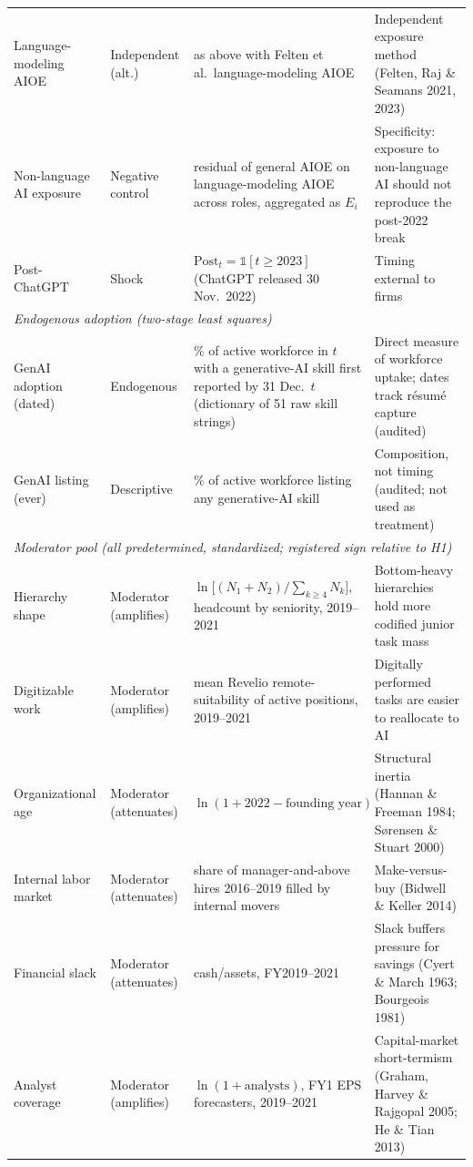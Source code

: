\begin{longtable}{p{2.3cm}p{1.35cm}p{6.3cm}p{5.2cm}}
Language-modeling AIOE & Independent (alt.) & as above with Felten et al.\ language-modeling AIOE & Independent exposure method (Felten, Raj \& Seamans 2021, 2023) \\
Non-language AI exposure & Negative control & residual of general AIOE on language-modeling AIOE across roles, aggregated as $E_i$ & Specificity: exposure to non-language AI should not reproduce the post-2022 break \\
Post-ChatGPT & Shock & $\text{Post}_t=\mathbb{1}[t\ge 2023]$ (ChatGPT released 30 Nov.\ 2022) & Timing external to firms \\
\midrule
\multicolumn{4}{l}{\textit{Endogenous adoption (two-stage least squares)}}\\
GenAI adoption (dated) & Endogenous & \% of active workforce in $t$ with a generative-AI skill first reported by 31 Dec.\ $t$ (dictionary of 51 raw skill strings) & Direct measure of workforce uptake; dates track r\'esum\'e capture (audited) \\
GenAI listing (ever) & Descriptive & \% of active workforce listing any generative-AI skill & Composition, not timing (audited; not used as treatment) \\
\midrule
\multicolumn{4}{l}{\textit{Moderator pool (all predetermined, standardized; registered sign relative to H1)}}\\
Hierarchy shape & Moderator (amplifies) & $\ln\big[(N_{1}+N_{2})/\sum_{k\ge4}N_{k}\big]$, headcount by seniority, 2019--2021 & Bottom-heavy hierarchies hold more codified junior task mass \\
Digitizable work & Moderator (amplifies) & mean Revelio remote-suitability of active positions, 2019--2021 & Digitally performed tasks are easier to reallocate to AI \\
Organizational age & Moderator (attenuates) & $\ln(1+2022-\text{founding year})$ & Structural inertia (Hannan \& Freeman 1984; S{\o}rensen \& Stuart 2000) \\
Internal labor market & Moderator (attenuates) & share of manager-and-above hires 2016--2019 filled by internal movers & Make-versus-buy (Bidwell \& Keller 2014) \\
Financial slack & Moderator (attenuates) & cash/assets, FY2019--2021 & Slack buffers pressure for savings (Cyert \& March 1963; Bourgeois 1981) \\
Analyst coverage & Moderator (amplifies) & $\ln(1+\text{analysts})$, FY1 EPS forecasters, 2019--2021 & Capital-market short-termism (Graham, Harvey \& Rajgopal 2005; He \& Tian 2013) \\

\end{longtable}
